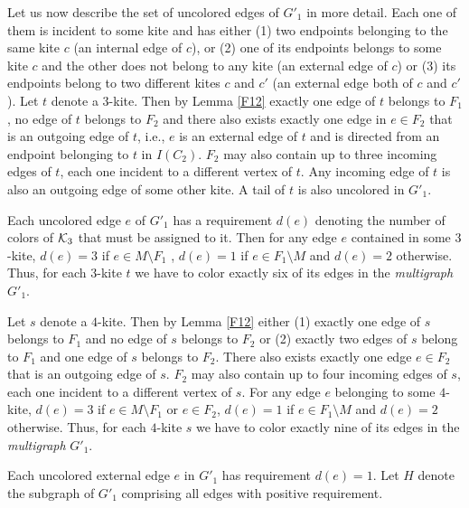 \documentclass[a4, 11pt]{article}
\newcommand{\<}{\langle}
\renewcommand{\>}{\rangle}
\newcommand{\Kt}{{\cal K}_3}
\begin{document}
Let us now describe the set of uncolored edges of $G'_1$ in more detail. Each one of them is incident to some kite and has either (1) two endpoints belonging to the same kite $c$ (an internal edge of $c$), or (2) one of its endpoints belongs to some kite $c$ and the other does not belong to any kite (an external edge of $c$) or (3) its endpoints belong to two different kites $c$ and $c'$ (an external edge both of $c$ and $c'$). Let $t$ denote a $3$-kite. Then by Lemma \ref{F12} exactly one edge  of $t$ belongs to $F_1$, no edge of $t$ belongs to $F_2$ and there also exists  exactly one edge in $e \in F_2$  that is an outgoing edge of $t$, i.e., $e$ is an external edge of $t$ and is directed from an endpoint belonging to $t$ in $I(C_2)$.
$F_2$ may also contain up to three incoming edges of $t$, each one incident to a different vertex of $t$.  Any incoming edge of $t$ is also an outgoing edge of some other kite. A tail of $t$ is also uncolored in $G'_1$. 

Each uncolored edge $e$ of $G'_1$ has a requirement $d(e)$ denoting the number of colors of $\Kt$ that must be assigned to it. 
 Then for any edge $e$ contained in some $3$-kite, $d(e)=3$ if $e \in M \setminus F_1$ , $d(e)=1$ if $e \in F_1\setminus M$ and $d(e)=2$ otherwise. Thus, for each $3$-kite $t$ we have to color exactly six of its edges in the {\em multigraph} $G'_1$.

Let $s$ denote a $4$-kite. Then by Lemma \ref{F12} either (1) exactly one edge  of $s$ belongs to $F_1$ and no edge of $s$ belongs to $F_2$ or (2) exactly two edges of $s$ belong to $F_1$ and one edge of $s$ belongs to $F_2$. There also exists  exactly one edge $e \in F_2$  that is an outgoing edge of $s$. $F_2$ may also contain up to four incoming edges of $s$, each one incident to a different vertex of $s$. For any edge $e$ belonging to some $4$-kite, $d(e)=3$ if $e \in M \setminus F_1$ or $e \in F_2$, $d(e)=1$ if $e \in F_1\setminus M$ and $d(e)=2$ otherwise.  Thus, for each $4$-kite $s$ we have to color exactly nine of its edges in the {\em multigraph} $G'_1$.


Each uncolored external edge $e$ in $G'_1$ has requirement $d(e)=1$. 
Let $H$ denote the subgraph of $G'_1$ comprising all edges  with positive requirement.
\end{document}
